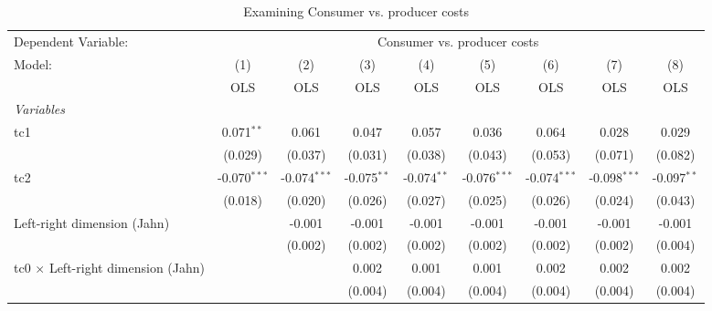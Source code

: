
\begin{table}[htbp]
   \caption{Examining Consumer vs. producer costs}
   \centering
   \begin{tabular}{lcccccccc}
      \toprule
      Dependent Variable: & \multicolumn{8}{c}{Consumer vs. producer costs}\\
      Model:                                    & (1)            & (2)            & (3)           & (4)           & (5)            & (6)            & (7)            & (8)\\  
                                                &  OLS           & OLS            & OLS           & OLS           & OLS            & OLS            & OLS            & OLS\\  
      \midrule
      \emph{Variables}\\
      tc1                                       & 0.071$^{**}$   & 0.061          & 0.047         & 0.057         & 0.036          & 0.064          & 0.028          & 0.029\\   
                                                & (0.029)        & (0.037)        & (0.031)       & (0.038)       & (0.043)        & (0.053)        & (0.071)        & (0.082)\\   
      tc2                                       & -0.070$^{***}$ & -0.074$^{***}$ & -0.075$^{**}$ & -0.074$^{**}$ & -0.076$^{***}$ & -0.074$^{***}$ & -0.098$^{***}$ & -0.097$^{**}$\\   
                                                & (0.018)        & (0.020)        & (0.026)       & (0.027)       & (0.025)        & (0.026)        & (0.024)        & (0.043)\\   
      Left-right dimension (Jahn)               &                & -0.001         & -0.001        & -0.001        & -0.001         & -0.001         & -0.001         & -0.001\\   
                                                &                & (0.002)        & (0.002)       & (0.002)       & (0.002)        & (0.002)        & (0.002)        & (0.004)\\   
      tc0 $\times$ Left-right dimension (Jahn)  &                &                & 0.002         & 0.001         & 0.001          & 0.002          & 0.002          & 0.002\\   
                                                &                &                & (0.004)       & (0.004)       & (0.004)        & (0.004)        & (0.004)        & (0.004)\\   

\end{tabular}
\end{table}
